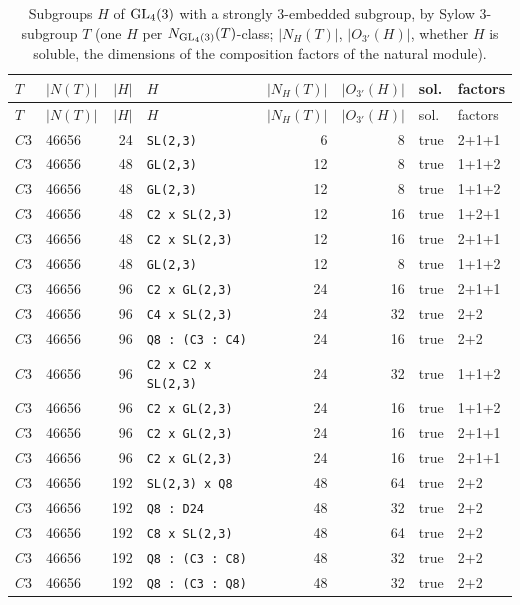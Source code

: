 \begin{longtable}{llrlrrll}
\caption{Subgroups $H$ of $\mathrm{GL}_4(3)$ with a strongly $3$-embedded subgroup, by Sylow $3$-subgroup $T$ (one $H$ per $N_{\mathrm{GL}_4(3)}(T)$-class; $|N_H(T)|$, $|O_{3'}(H)|$, whether $H$ is soluble, the dimensions of the composition factors of the natural module).}\label{tab:gl4}\\
\toprule
$T$ & $|N(T)|$ & $|H|$ & $H$ & $|N_H(T)|$ & $|O_{3'}(H)|$ & sol. & factors\\
\midrule
\endfirsthead
\toprule
$T$ & $|N(T)|$ & $|H|$ & $H$ & $|N_H(T)|$ & $|O_{3'}(H)|$ & sol. & factors\\
\midrule
\endhead
\bottomrule
\endfoot
$C3$ & 46656 & 24 & \texttt{SL(2,3)} & 6 & 8 & true & 2+1+1\\
$C3$ & 46656 & 48 & \texttt{GL(2,3)} & 12 & 8 & true & 1+1+2\\
$C3$ & 46656 & 48 & \texttt{GL(2,3)} & 12 & 8 & true & 1+1+2\\
$C3$ & 46656 & 48 & \texttt{C2 x SL(2,3)} & 12 & 16 & true & 1+2+1\\
$C3$ & 46656 & 48 & \texttt{C2 x SL(2,3)} & 12 & 16 & true & 2+1+1\\
$C3$ & 46656 & 48 & \texttt{GL(2,3)} & 12 & 8 & true & 1+1+2\\
$C3$ & 46656 & 96 & \texttt{C2 x GL(2,3)} & 24 & 16 & true & 2+1+1\\
$C3$ & 46656 & 96 & \texttt{C4 x SL(2,3)} & 24 & 32 & true & 2+2\\
$C3$ & 46656 & 96 & \texttt{Q8 : (C3 : C4)} & 24 & 16 & true & 2+2\\
$C3$ & 46656 & 96 & \texttt{C2 x C2 x SL(2,3)} & 24 & 32 & true & 1+1+2\\
$C3$ & 46656 & 96 & \texttt{C2 x GL(2,3)} & 24 & 16 & true & 1+1+2\\
$C3$ & 46656 & 96 & \texttt{C2 x GL(2,3)} & 24 & 16 & true & 2+1+1\\
$C3$ & 46656 & 96 & \texttt{C2 x GL(2,3)} & 24 & 16 & true & 2+1+1\\
$C3$ & 46656 & 192 & \texttt{SL(2,3) x Q8} & 48 & 64 & true & 2+2\\
$C3$ & 46656 & 192 & \texttt{Q8 : D24} & 48 & 32 & true & 2+2\\
$C3$ & 46656 & 192 & \texttt{C8 x SL(2,3)} & 48 & 64 & true & 2+2\\
$C3$ & 46656 & 192 & \texttt{Q8 : (C3 : C8)} & 48 & 32 & true & 2+2\\
$C3$ & 46656 & 192 & \texttt{Q8 : (C3 : Q8)} & 48 & 32 & true & 2+2\\

\end{longtable}

